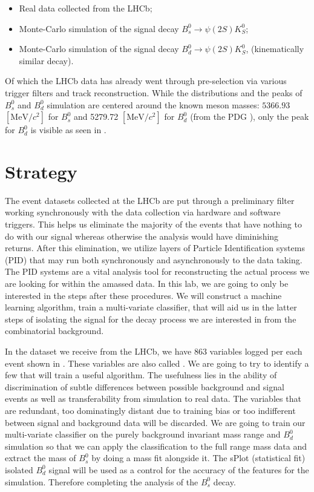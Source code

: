 \begin{itemize}
    \item Real data collected from the LHCb;
    \item Monte-Carlo simulation of the signal decay $B_{s}^{0}\rightarrow \psi(2S)K_{S}^{0}$;
    \item Monte-Carlo simulation of the signal decay $B_{d}^{0}\rightarrow \psi(2S)K_{S}^{0}$, (kinematically similar decay).
\end{itemize}
Of which the LHCb data has already went through pre-selection via various trigger filters and track reconstruction. While the distributions and the peaks of $B_{s}^{0}$ and $B_{d}^{0}$ simulation are centered around the known meson masses: $5366.93$ $[\text{MeV}/c^2]$ for $B_s^0$ and 5279.72 $[\text{MeV}/c^2]$ for $B_d^0$ (from the PDG \cite{PDG}), only the peak for $B_d^0$ is visible as seen in . 


\section{Strategy}
The event datasets collected at the LHCb are put through a preliminary filter working synchronously with the data collection via hardware and software triggers. This helps us eliminate the majority of the events that have nothing to do with our signal whereas otherwise the analysis would have diminishing returns. After this elimination, we utilize layers of Particle Identification systems (PID) that may run both synchronously and asynchronously to the data taking. The PID systems are a vital analysis tool for reconstructing the actual process we are looking for within the amassed data. In this lab, we are going to only be interested in the steps after these procedures. We will construct a machine learning algorithm, train a multi-variate classifier, that will aid us in the latter steps of isolating the signal for the decay process we are interested in from the combinatorial background.

In the dataset we receive from the LHCb, we have 863 variables logged per each event shown in . These variables are also called . We are going to try to identify a few that will train a useful algorithm. The usefulness lies in the ability of discrimination of subtle differences between possible background and signal events as well as transferability from simulation to real data. The variables that are redundant, too dominatingly distant due to training bias or too indifferent between signal and background data will be discarded. We are going to train our multi-variate classifier on the purely background invariant mass range and $B_d^0$ simulation so that we can apply the classification to the full range mass data and extract the mass of $B_s^0$ by doing a mass fit alongside it. The sPlot (statistical fit) isolated $B_d^0$ signal will be used as a control for the accuracy of the features for the simulation. Therefore completing the analysis of the $B_s^0$ decay.

